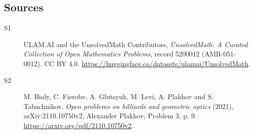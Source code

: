 \documentclass[11pt]{article}
\begin{document}
\subsection{Sources}
\begin{description}
\item[\hypertarget{source:5200012:1}{S1}] ULAM.AI and the UnsolvedMath Contributors, \emph{UnsolvedMath: A Curated Collection of Open Mathematics Problems}, record 5200012 (AMR-051-0012). CC BY 4.0. \url{https://huggingface.co/datasets/ulamai/UnsolvedMath}.
\item[\hypertarget{source:5200012:2}{S2}] M. Bialy, C. Fierobe, A. Glutsyuk, M. Levi, A. Plakhov and S. Tabachnikov, \emph{Open problems on billiards and geometric optics} (2021), arXiv:2110.10750v2, Alexander Plakhov, Problem 3, p. 9. \url{https://arxiv.org/pdf/2110.10750v2}.
\end{description}
\label{end:5200012}
\end{document}

